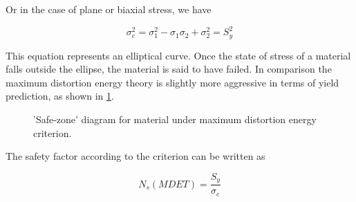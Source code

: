 \documentclass[
10pt,
a4paper,
openany,
svgnames,
]{book} %
\begin{document}
Or in the case of plane or biaxial stress, we have

\begin{equation}
  \sigma_e^2 = \sigma_1^2 - \sigma_1\sigma_2 + \sigma_2^2 = S_y^2
\end{equation}

This equation represents an elliptical curve. Once the state of stress of a material falls outside the ellipse, the material is said to have failed.
In comparison the maximum distortion energy theory is slightly more aggressive in terms of yield prediction, as shown in \cref{fig: MDET safe zone}.

\begin{figure}[h]
  \centering
  \caption{'Safe-zone' diagram for material under maximum distortion energy criterion.}
  \label{fig: MDET safe zone}
\end{figure}

The safety factor according to the criterion can be written as

\begin{equation}
  N_s(MDET) = \frac{S_y}{\sigma_e}
\end{equation}
\end{document}
